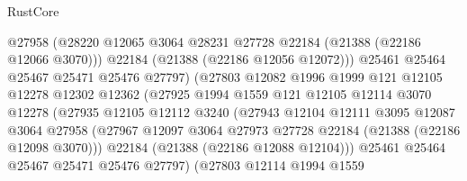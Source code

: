 \begin{lexlean}{RustCore}
\begin{coremodule}
                                @27958
                                (@28220
                                  @12065
                                  @3064
                                  @28231
                                  @27728
                                  @22184
                                  (@21388 (@22186 @12066 @3070)))
                                @22184
                                (@21388 (@22186 @12056 @12072)))
                              @25461
                              @25464
                              @25467
                              @25471
                              @25476
                              @27797)
                            (@27803
                              @12082
                              @1996
                              @1999
                              @121
                              @12105
                              @12278
                              @12302
                              @12362
                              (@27925
                                @1994
                                @1559
                                @121
                                @12105
                                @12114
                                @3070
                                @12278
                                (@27935
                                  @12105
                                  @12112
                                  @3240
                                  (@27943
                                    @12104
                                    @12111
                                    @3095
                                    @12087
                                    @3064
                                    @27958
                                    (@27967
                                      @12097
                                      @3064
                                      @27973
                                      @27728
                                      @22184
                                      (@21388 (@22186 @12098 @3070)))
                                    @22184
                                    (@21388 (@22186 @12088 @12104)))
                                  @25461
                                  @25464
                                  @25467
                                  @25471
                                  @25476
                                  @27797)
                                (@27803
                                  @12114
                                  @1994
                                  @1559

\end{coremodule}
\end{lexlean}

